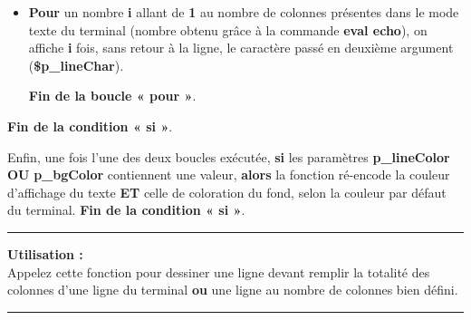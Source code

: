 \documentclass[a4paper,10pt]{article}
\begin{document}
    \begin{itemize}
        \item
        {
            \begin{justify}
                \textbf{\color{loop}Pour} un nombre \textbf{\color{vars}i} allant de \textbf{\color{loop}1} au nombre de colonnes présentes dans le mode texte du terminal (nombre obtenu grâce à la commande \textbf{\color{cmds}eval echo}), on affiche \textbf{\color{vars}i} fois, sans retour à la ligne, le caractère passé en deuxième argument (\textbf{\color{vars}\$p\_lineChar}).
            \end{justify}\setlength{\parskip}{1em}

            \begin{justify}
                \textbf{\color{loop}Fin de la boucle « pour »}.
            \end{justify}
        }
    \end{itemize}

    \begin{justify}
        \textbf{\color{cond}Fin de la condition « si »}.
    \end{justify}

    \setlength{\parskip}{2em}


    \begin{justify}
        Enfin, une fois l'une des deux boucles exécutée, \textbf{\color{cond}si} les paramètres \textbf{\color{vars}p\_lineColor} \textbf{\color{cond}OU} \textbf{\color{vars}p\_bgColor} contiennent une valeur, \textbf{\color{cond}alors} la fonction ré-encode la couleur d'affichage du texte \textbf{ET} celle de coloration du fond, selon la couleur par défaut du terminal. \textbf{\color{cond}Fin de la condition « si »}.
    \end{justify}\setlength{\parskip}{1em}

    \par\noindent\rule{\textwidth}{0.4pt}

    \begin{justify}
        \textbf{Utilisation :}\\[1\baselineskip]
        Appelez cette fonction pour dessiner une ligne devant remplir la totalité des colonnes d'une ligne du terminal \textbf{ou} une ligne au nombre de colonnes bien défini.
    \end{justify}



    \color{sec3}\par\noindent\rule{\textwidth}{0.4pt}\color{text}
\end{document}
